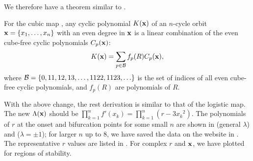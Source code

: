\documentclass[preprint]{revtex4-1}
\begin{document}
We therefore have a theorem similar to .
%
%
\begin{theorem}
  For the cubic map ,
  any cyclic polynomial $K(\mathbf{x})$ of
  an $n$-cycle orbit
  $\mathbf{x} = \{x_1, \ldots, x_n\}$
  with an even degree in $\mathbf{x}$
  is a linear combination of
the even cube-free cyclic polynomials $C_p(\mathbf{x})$:
\[
  K(\mathbf{x}) = \sum_{p \in \mathcal B} f_p(R) C_p(\mathbf{x}),
\]
  where $\mathcal B = \{0, 11, 12, 13, \ldots, 1122, 1123, \ldots \}$ is
  the set of indices of all even cube-free cyclic polynomials,
  and $f_p(R)$ are polynomials of $R$.
  \label{thm:cubfree}
\end{theorem}






With the above change, the rest derivation is similar to that of the logistic map.
The new $\Lambda(\mathbf{x})$ should be
$\prod_{k=1}^n f'(x_k) = \prod_{k=1}^n (r - 3 {x_k}^2)$.
%
The polynomials of $r$
  at the onset and bifurcation points
for some small $n$ are shown in  (general $\lambda$)
and  ($\lambda = \pm1$);
for larger $n$ up to 8,
we have saved the data on the website in .
%
The representative $r$ values are listed in .
%
For complex $r$ and $\mathbf{x}$,
we have plotted  for regions of stability.
\end{document}
